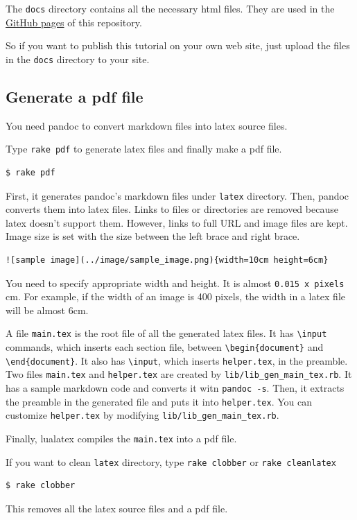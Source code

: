 The \texttt{docs} directory contains all the necessary html files. They
are used in the \href{https://ToshioCP.github.io/Gtk4-tutorial}{GitHub
pages} of this repository.

So if you want to publish this tutorial on your own web site, just
upload the files in the \texttt{docs} directory to your site.

\subsection{Generate a pdf file}\label{generate-a-pdf-file}

You need pandoc to convert markdown files into latex source files.

Type \texttt{rake\ pdf} to generate latex files and finally make a pdf
file.

\begin{verbatim}
$ rake pdf
\end{verbatim}

First, it generates pandoc's markdown files under \texttt{latex}
directory. Then, pandoc converts them into latex files. Links to files
or directories are removed because latex doesn't support them. However,
links to full URL and image files are kept. Image size is set with the
size between the left brace and right brace.

\begin{verbatim}
![sample image](../image/sample_image.png){width=10cm height=6cm}
\end{verbatim}

You need to specify appropriate width and height. It is almost
\texttt{0.015\ x\ pixels} cm. For example, if the width of an image is
400 pixels, the width in a latex file will be almost 6cm.

A file \texttt{main.tex} is the root file of all the generated latex
files. It has \texttt{\textbackslash{}input} commands, which inserts
each section file, between \texttt{\textbackslash{}begin\{document\}}
and \texttt{\textbackslash{}end\{document\}}. It also has
\texttt{\textbackslash{}input}, which inserts \texttt{helper.tex}, in
the preamble. Two files \texttt{main.tex} and \texttt{helper.tex} are
created by \texttt{lib/lib\_gen\_main\_tex.rb}. It has a sample markdown
code and converts it witn \texttt{pandoc\ -s}. Then, it extracts the
preamble in the generated file and puts it into \texttt{helper.tex}. You
can customize \texttt{helper.tex} by modifying
\texttt{lib/lib\_gen\_main\_tex.rb}.

Finally, lualatex compiles the \texttt{main.tex} into a pdf file.

If you want to clean \texttt{latex} directory, type
\texttt{rake\ clobber} or \texttt{rake\ cleanlatex}

\begin{verbatim}
$ rake clobber
\end{verbatim}

This removes all the latex source files and a pdf file.
